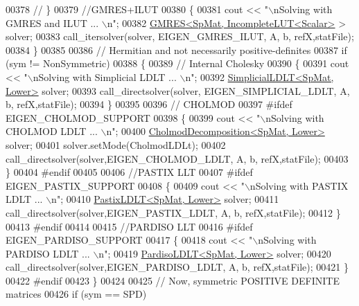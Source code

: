 \begin{DoxyCode}
00378 \textcolor{comment}{//   \}}
00379   \textcolor{comment}{//GMRES+ILUT}
00380   \{
00381     cout << \textcolor{stringliteral}{"\(\backslash\)nSolving with GMRES and ILUT ... \(\backslash\)n"}; 
00382     \hyperlink{group___iterative_linear_solvers___module_class_eigen_1_1_g_m_r_e_s}{GMRES<SpMat, IncompleteLUT<Scalar>} > solver; 
00383     call\_itersolver(solver, EIGEN\_GMRES\_ILUT, A, b, refX,statFile);
00384   \}
00385   
00386   \textcolor{comment}{// Hermitian and not necessarily positive-definites}
00387   \textcolor{keywordflow}{if} (sym != NonSymmetric)
00388   \{
00389     \textcolor{comment}{// Internal Cholesky}
00390     \{
00391       cout << \textcolor{stringliteral}{"\(\backslash\)nSolving with Simplicial LDLT ... \(\backslash\)n"}; 
00392       \hyperlink{group___sparse_cholesky___module_class_eigen_1_1_simplicial_l_d_l_t}{SimplicialLDLT<SpMat, Lower>} solver;
00393       call\_directsolver(solver, EIGEN\_SIMPLICIAL\_LDLT, A, b, refX,statFile); 
00394     \}
00395     
00396     \textcolor{comment}{// CHOLMOD}
00397 \textcolor{preprocessor}{    #ifdef EIGEN\_CHOLMOD\_SUPPORT}
00398     \{
00399       cout << \textcolor{stringliteral}{"\(\backslash\)nSolving with CHOLMOD LDLT ... \(\backslash\)n"}; 
00400       \hyperlink{class_eigen_1_1_cholmod_decomposition}{CholmodDecomposition<SpMat, Lower>} solver;
00401       solver.setMode(CholmodLDLt);
00402        call\_directsolver(solver,EIGEN\_CHOLMOD\_LDLT, A, b, refX,statFile);
00403     \}
00404 \textcolor{preprocessor}{    #endif}
00405     
00406     \textcolor{comment}{//PASTIX LLT}
00407 \textcolor{preprocessor}{    #ifdef EIGEN\_PASTIX\_SUPPORT}
00408     \{
00409       cout << \textcolor{stringliteral}{"\(\backslash\)nSolving with PASTIX LDLT ... \(\backslash\)n"}; 
00410       \hyperlink{class_eigen_1_1_pastix_l_d_l_t}{PastixLDLT<SpMat, Lower>} solver; 
00411       call\_directsolver(solver,EIGEN\_PASTIX\_LDLT, A, b, refX,statFile); 
00412     \}
00413 \textcolor{preprocessor}{    #endif}
00414     
00415     \textcolor{comment}{//PARDISO LLT}
00416 \textcolor{preprocessor}{    #ifdef EIGEN\_PARDISO\_SUPPORT}
00417     \{
00418       cout << \textcolor{stringliteral}{"\(\backslash\)nSolving with PARDISO LDLT ... \(\backslash\)n"}; 
00419       \hyperlink{class_eigen_1_1_pardiso_l_d_l_t}{PardisoLDLT<SpMat, Lower>} solver; 
00420       call\_directsolver(solver,EIGEN\_PARDISO\_LDLT, A, b, refX,statFile); 
00421     \}
00422 \textcolor{preprocessor}{    #endif}
00423   \}
00424 
00425    \textcolor{comment}{// Now, symmetric POSITIVE DEFINITE matrices}
00426   \textcolor{keywordflow}{if} (sym == SPD)

\end{DoxyCode}

